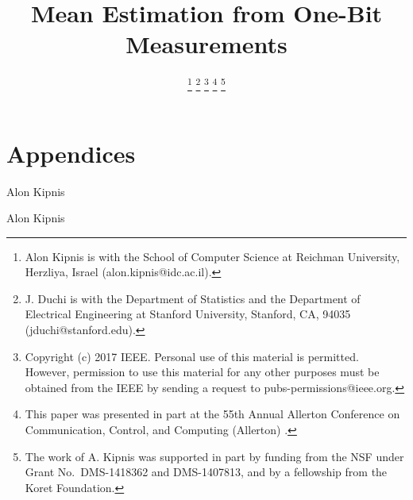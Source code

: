 \documentclass[letterpaper, 11pt]{IEEEtran}      %
\author{
    \IEEEauthorblockN{
Alon~Kipnis and   
    John~C.~Duchi}

\thanks{
Alon Kipnis is with the School of Computer Science at Reichman University, Herzliya, Israel (alon.kipnis@idc.ac.il).} 
\thanks{J. Duchi is with the Department of Statistics and the Department of Electrical Engineering at Stanford University, Stanford, CA, 94035 (jduchi@stanford.edu).}
\thanks{Copyright (c) 2017 IEEE. Personal use of this material is permitted.  However, permission to use this material for any other purposes must be obtained from the IEEE by sending a request to pubs-permissions@ieee.org.}
\thanks{This paper was presented in part at the 55th Annual Allerton Conference on Communication, Control, and Computing (Allerton) \cite{KipnisAllerton2017}. }
\thanks{
The work of A. Kipnis was supported in part by funding from the NSF under Grant No.~DMS-1418362 and DMS-1407813, and by a fellowship from the Koret Foundation.}
}
\title{\LARGE \bf Mean Estimation from One-Bit Measurements}
\begin{document}
\graphicspath{{./Figs/}}
\maketitle

















\newpage

\section*{Appendices}










\begin{IEEEbiographynophoto}{Alon Kipnis}

\end{IEEEbiographynophoto}


\begin{IEEEbiographynophoto}{Alon Kipnis}

\end{IEEEbiographynophoto}
\end{document}
